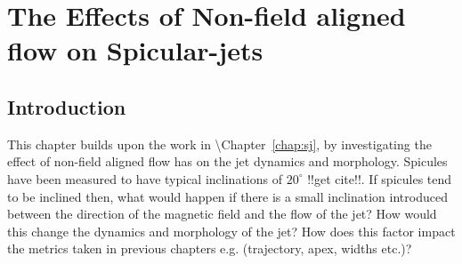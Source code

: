\documentclass[12pt]{ociamthesis}
\begin{document}
\baselineskip=18pt

\setcounter{secnumdepth}{3}
\setcounter{tocdepth}{3}

\setcounter{chapter}{2}

\chapter{The Effects of Non-field aligned flow on Spicular-jets}
\section{Introduction}
\label{sec:c3intro}
This chapter builds upon the work in \cite{?}\textbackslash Chapter~\ref{chap:sj}, by investigating the effect of non-field aligned flow has on the jet dynamics and morphology. Spicules have been measured to have typical inclinations of $20^{\circ}$ !!get cite!!. If spicules tend to be inclined then, what would happen if there is a small inclination introduced between the direction of the magnetic field and the flow of the jet? How would this change the dynamics and morphology of the jet? How does this factor impact the metrics taken in previous chapters e.g. (trajectory, apex, widths etc.)?
\end{document}

